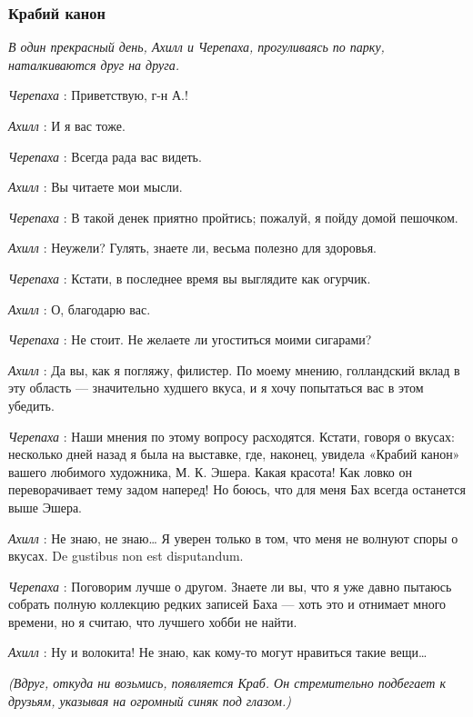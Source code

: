 \subsubsection{Крабий канон}

\emph{В один прекрасный день, Ахилл и Черепаха, прогуливаясь по парку, наталкиваются друг на друга.}

\emph{Черепаха} : Приветствую, г-н А.!

\emph{Ахилл} : И я вас тоже.

\emph{Черепаха} : Всегда рада вас видеть.

\emph{Ахилл} : Вы читаете мои мысли.

\emph{Черепаха} : В такой денек приятно пройтись; пожалуй, я пойду домой пешочком.

\emph{Ахилл} : Неужели? Гулять, знаете ли, весьма полезно для здоровья.

\emph{Черепаха} : Кстати, в последнее время вы выглядите как огурчик.

\emph{Ахилл} : О, благодарю вас.

\emph{Черепаха} : Не стоит. Не желаете ли угоститься моими сигарами?

\emph{Ахилл} : Да вы, как я погляжу, филистер. По моему мнению, голландский вклад в эту область --- значительно худшего вкуса, и я хочу попытаться вас в этом убедить.

\emph{Черепаха} : Наши мнения по этому вопросу расходятся. Кстати, говоря о вкусах: несколько дней назад я была на выставке, где, наконец, увидела «Крабий канон» вашего любимого художника, М. К. Эшера. Какая красота! Как ловко он переворачивает тему задом наперед! Но боюсь, что для меня Бах всегда останется выше Эшера.

\emph{Ахилл} : Не знаю, не знаю\ldots{} Я уверен только в том, что меня не волнуют споры о вкусах. De gustibus non est disputandum.

\emph{Черепаха} : Поговорим лучше о другом. Знаете ли вы, что я уже давно пытаюсь собрать полную коллекцию редких записей Баха --- хоть это и отнимает много времени, но я считаю, что лучшего хобби не найти.

\emph{Ахилл} : Ну и волокита! Не знаю, как кому-то могут нравиться такие вещи\ldots{}

\emph{(Вдруг, откуда ни возьмись, появляется Краб. Он стремительно подбегает к друзьям, указывая на огромный синяк под глазом.)}

